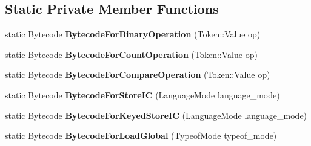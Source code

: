 \subsection*{Static Private Member Functions}
\begin{DoxyCompactItemize}
\item 
static Bytecode {\bfseries Bytecode\+For\+Binary\+Operation} (Token\+::\+Value op)\hypertarget{classv8_1_1internal_1_1interpreter_1_1_bytecode_array_builder_afcb46baf6f73e002e6363e2b42f6f626}{}\label{classv8_1_1internal_1_1interpreter_1_1_bytecode_array_builder_afcb46baf6f73e002e6363e2b42f6f626}

\item 
static Bytecode {\bfseries Bytecode\+For\+Count\+Operation} (Token\+::\+Value op)\hypertarget{classv8_1_1internal_1_1interpreter_1_1_bytecode_array_builder_a159361a198e3be5787781092d14e6506}{}\label{classv8_1_1internal_1_1interpreter_1_1_bytecode_array_builder_a159361a198e3be5787781092d14e6506}

\item 
static Bytecode {\bfseries Bytecode\+For\+Compare\+Operation} (Token\+::\+Value op)\hypertarget{classv8_1_1internal_1_1interpreter_1_1_bytecode_array_builder_acd57768296ba90aa4ebf8d1ff2fd009a}{}\label{classv8_1_1internal_1_1interpreter_1_1_bytecode_array_builder_acd57768296ba90aa4ebf8d1ff2fd009a}

\item 
static Bytecode {\bfseries Bytecode\+For\+Store\+IC} (Language\+Mode language\+\_\+mode)\hypertarget{classv8_1_1internal_1_1interpreter_1_1_bytecode_array_builder_a1ced5b070c9e32990b65b24ddd1075f3}{}\label{classv8_1_1internal_1_1interpreter_1_1_bytecode_array_builder_a1ced5b070c9e32990b65b24ddd1075f3}

\item 
static Bytecode {\bfseries Bytecode\+For\+Keyed\+Store\+IC} (Language\+Mode language\+\_\+mode)\hypertarget{classv8_1_1internal_1_1interpreter_1_1_bytecode_array_builder_aead62f508ce1d5b8e814adfb79ca9769}{}\label{classv8_1_1internal_1_1interpreter_1_1_bytecode_array_builder_aead62f508ce1d5b8e814adfb79ca9769}

\item 
static Bytecode {\bfseries Bytecode\+For\+Load\+Global} (Typeof\+Mode typeof\+\_\+mode)\hypertarget{classv8_1_1internal_1_1interpreter_1_1_bytecode_array_builder_a0493b85cbae451f54e16de75715ee348}{}\label{classv8_1_1internal_1_1interpreter_1_1_bytecode_array_builder_a0493b85cbae451f54e16de75715ee348}


\end{DoxyCompactItemize}
